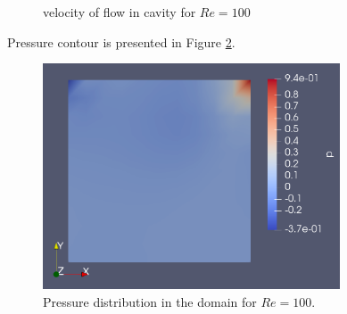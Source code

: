 \documentclass[]{article}
\begin{document}
\begin{figure}[htbp]
	\centering
	\qquad
	\caption{velocity of flow in cavity for $Re=100$}%
	\label{fig_Rs1}%
\end{figure}
Pressure contour is presented in Figure \ref{fig_Rs2}.
\begin{figure}[htbp]
	\centering
	\includegraphics[width=250pt]{Figures/p.png}
	\caption{Pressure distribution in the domain for $Re=100$.}
	\label{fig_Rs2}
\end{figure}


\end{document}
